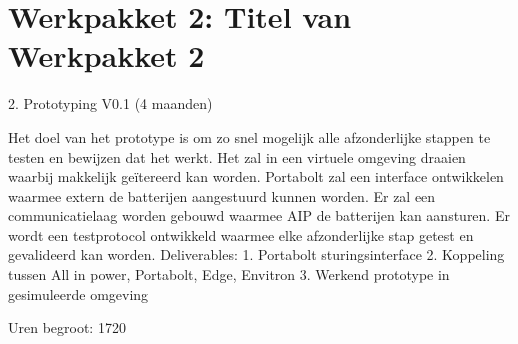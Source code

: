 \section{Werkpakket 2: Titel van Werkpakket 2}
2. Prototyping V0.1 (4 maanden) 

Het doel van het prototype is om zo snel mogelijk alle afzonderlijke stappen te testen en bewijzen dat het werkt. Het zal in een virtuele omgeving draaien waarbij makkelijk geïtereerd kan worden. Portabolt zal een interface ontwikkelen waarmee extern de batterijen aangestuurd kunnen worden. Er zal een communicatielaag worden gebouwd waarmee AIP de batterijen kan aansturen. Er wordt een testprotocol ontwikkeld waarmee elke afzonderlijke stap getest en gevalideerd kan worden. 
Deliverables: 
1. Portabolt sturingsinterface 
2. Koppeling tussen All in power, Portabolt, Edge, Envitron 
3. Werkend prototype in gesimuleerde omgeving 

Uren begroot: 1720

